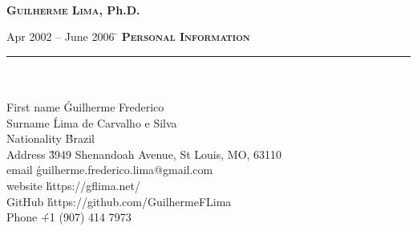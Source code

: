 \documentclass[11pt,a4paper]{article}
\begin{document}
\makeatletter
 \renewcommand{\@evenhead}{\textit{Guilherme Lima CV continued...}\hfil}
 \renewcommand{\@oddhead}{\@evenhead}
 \renewcommand{\@evenfoot}{\hfil \thepage\ of\  \pageref{LastPage}\hfil}
 \renewcommand{\@oddfoot}{\@evenfoot}
\makeatother



\thispagestyle{empty}
\begin{center}
{\huge\textbf{\textsc{\\ Guilherme Lima}, Ph.D.}} \\ \vspace{0.5cm}
\vspace{1.0cm}
\end{center}
\begin{tabbing} 
Apr 2002 -- June 2006 \=\kill
\> \textbf{\Large{\textsc{Personal Information}}}\\
\> \noindent\rule{11cm}{1pt}\\
\\
\> First name \' Guilherme Frederico \\
\> Surname \' Lima de Carvalho e Silva \\
\> Nationality \' Brazil \\
\> Address  \' 3949 Shenandoah Avenue, St Louis, MO, 63110 \\
\> email \' guilherme.frederico.lima@gmail.com \\
\> website \' https://gflima.net/ \\
\> GitHub \' https://github.com/GuilhermeFLima \\
\> Phone  \' +1 (907) 414 7973 \\
\end{tabbing}



\end{document}
